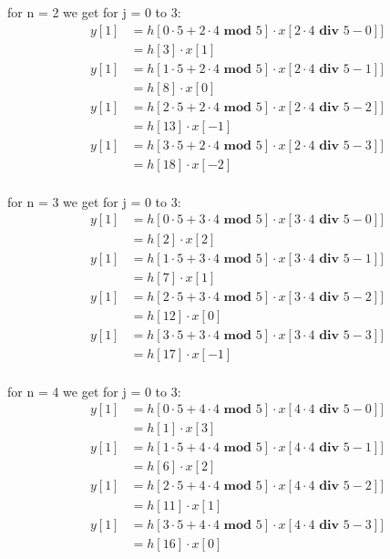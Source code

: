 \documentclass[a4paper,twoside,11pt, fleqn]{article}
\begin{document}
for n = 2 we get for j = 0 to 3:
\begin{align}
y[1] &= h[0\cdot 5 + 2\cdot 4 \textbf{ mod } 5]\cdot x[2\cdot 4 \textbf{ div } 5 - 0]]\\ 
&= h[3]\cdot x[1] \\
y[1] &= h[1\cdot 5 + 2\cdot 4 \textbf{ mod } 5]\cdot x[2\cdot 4 \textbf{ div } 5 - 1]] \\
&= h[8]\cdot x[0] \\
y[1] &= h[2\cdot 5 + 2\cdot 4 \textbf{ mod } 5]\cdot x[2\cdot 4 \textbf{ div } 5 - 2]] \\
&= h[13]\cdot x[-1] \\
y[1] &= h[3\cdot 5 + 2\cdot 4 \textbf{ mod } 5]\cdot x[2\cdot 4 \textbf{ div } 5 - 3]] \\
&= h[18]\cdot x[-2] \\
\end{align}

for n = 3 we get for j = 0 to 3:
\begin{align}
y[1] &= h[0\cdot 5 + 3\cdot 4 \textbf{ mod } 5]\cdot x[3\cdot 4 \textbf{ div } 5 - 0]]\\ 
&= h[2]\cdot x[2] \\
y[1] &= h[1\cdot 5 + 3\cdot 4 \textbf{ mod } 5]\cdot x[3\cdot 4 \textbf{ div } 5 - 1]] \\
&= h[7]\cdot x[1] \\
y[1] &= h[2\cdot 5 + 3\cdot 4 \textbf{ mod } 5]\cdot x[3\cdot 4 \textbf{ div } 5 - 2]] \\
&= h[12]\cdot x[0] \\
y[1] &= h[3\cdot 5 + 3\cdot 4 \textbf{ mod } 5]\cdot x[3\cdot 4 \textbf{ div } 5 - 3]] \\
&= h[17]\cdot x[-1] \\
\end{align}

for n = 4 we get for j = 0 to 3:
\begin{align}
y[1] &= h[0\cdot 5 + 4\cdot 4 \textbf{ mod } 5]\cdot x[4\cdot 4 \textbf{ div } 5 - 0]]\\ 
&= h[1]\cdot x[3] \\
y[1] &= h[1\cdot 5 + 4\cdot 4 \textbf{ mod } 5]\cdot x[4\cdot 4 \textbf{ div } 5 - 1]] \\
&= h[6]\cdot x[2] \\
y[1] &= h[2\cdot 5 + 4\cdot 4 \textbf{ mod } 5]\cdot x[4\cdot 4 \textbf{ div } 5 - 2]] \\
&= h[11]\cdot x[1] \\
y[1] &= h[3\cdot 5 + 4\cdot 4 \textbf{ mod } 5]\cdot x[4\cdot 4 \textbf{ div } 5 - 3]] \\
&= h[16]\cdot x[0] \\
\end{align}
\end{document}
